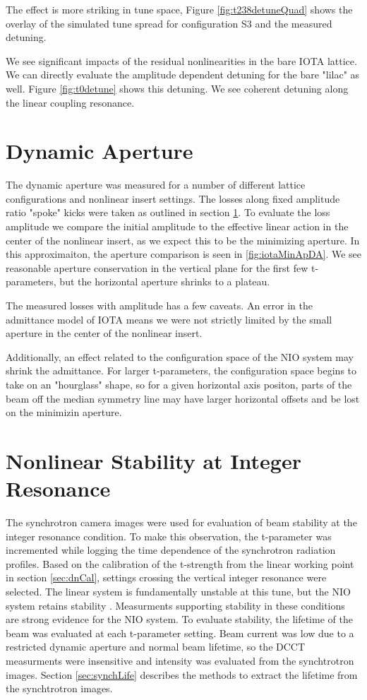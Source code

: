 The effect is more striking in tune space, Figure \ref{fig:t238detuneQuad} shows the overlay of the simulated tune spread for configuration S3 and the measured detuning.

We see significant impacts of the residual nonlinearities in the bare IOTA lattice. We can directly evaluate the amplitude dependent detuning for the bare "lilac" as well. Figure \ref{fig:t0detune} shows this detuning. We see coherent detuning along the linear coupling resonance.

\section{Dynamic Aperture} \label{sec:DA}
The dynamic aperture was measured for a number of different lattice configurations and nonlinear insert settings. The losses along fixed amplitude ratio "spoke" kicks were taken as outlined in section \ref{sec:DA}. To evaluate the loss amplitude we compare the initial amplitude to the effective linear action in the center of the nonlinear insert, as we expect this to be the minimizing aperture. In this approximaiton, the aperture comparison is seen in \ref{fig:iotaMinApDA}. We see reasonable aperture conservation in the vertical plane for the first few t-parameters, but the horizontal aperture shrinks to a plateau.

The measured losses with amplitude has a few caveats. An error in the admittance model of IOTA means we were not strictly limited by the small aperture in the center of the nonlinear insert.

Additionally, an effect related to the configuration space of the NIO system may shrink the admittance. For larger t-parameters, the configuration space begins to take on an "hourglass" shape, so for a given horizontal axis positon, parts of the beam off the median symmetry line may have larger horizontal offsets and be lost on the minimizin aperture.

\section{Nonlinear Stability at Integer Resonance} \label{sec:intCross}
The synchrotron camera images were used for evaluation of beam stability at the integer resonance condition. To make this observation, the t-parameter was incremented while logging the time dependence of the synchrotron radiation profiles. Based on the calibration of the t-strength from the linear working point in section \ref{sec:dnCal}, settings crossing the vertical integer resonance were selected. The linear system is fundamentally unstable at this tune, but the NIO system retains stability . Measurments supporting stability in these conditions are strong evidence for the NIO system. To evaluate stability, the lifetime of the beam was evaluated at each t-parameter setting. Beam current was low due to a restricted dynamic aperture and normal beam lifetime, so the DCCT measurments were insensitive and intensity was evaluated from the synchtrotron images. Section \ref{sec:synchLife} describes the methods to extract the lifetime from the synchtrotron images.

